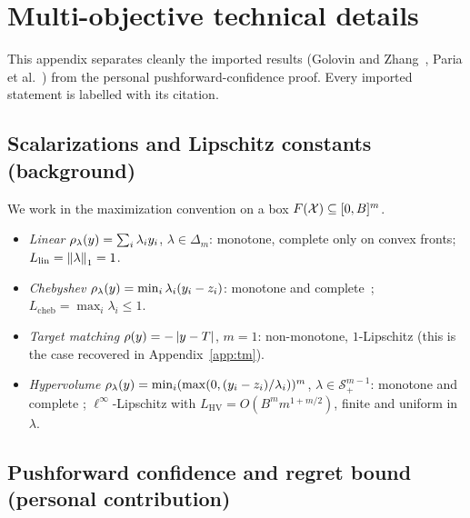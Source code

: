 \section{Multi-objective technical details}
\label{app:mo}

This appendix separates cleanly the imported results (Golovin and
Zhang~\cite{golovin2020}, Paria et al.~\cite{paria2019}) from the personal
pushforward-confidence proof. Every imported statement is labelled with its
citation.

\subsection{Scalarizations and Lipschitz constants (background)}

We work in the maximization convention on a box $F(\mathcal{X})\subseteq[0,B]^m$.
\begin{itemize}
  \item \emph{Linear} $\rho_\lambda(y)=\sum_i\lambda_i y_i$, $\lambda\in\Delta_m$:
        monotone, complete only on convex fronts; $L_{\mathrm{lin}}=\left\lVert \lambda\right\rVert_1=1$.
  \item \emph{Chebyshev} $\rho_\lambda(y)=\min_i\lambda_i(y_i-z_i)$: monotone and
        complete~\cite{paria2019}; $L_{\mathrm{cheb}}=\max_i\lambda_i\le1$.
  \item \emph{Target matching} $\rho(y)=-\left\lvert y-T\right\rvert$, $m=1$: non-monotone,
        $1$-Lipschitz (this is the case recovered in Appendix~\ref{app:tm}).
  \item \emph{Hypervolume} $\rho_\lambda(y)=\min_i(\max(0,(y_i-z_i)/\lambda_i))^m$,
        $\lambda\in\mathcal S_+^{m-1}$: monotone and complete
        \cite[Lemma~6]{golovin2020}; $\ell^\infty$-Lipschitz with
        $L_{\mathrm{HV}}=O(B^m m^{1+m/2})$, finite and uniform in $\lambda$.
\end{itemize}

\subsection{Pushforward confidence and regret bound (personal contribution)}

